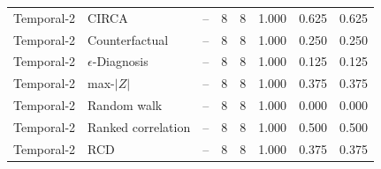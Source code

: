 {\begin{longtable}{llrrrrrr}
Temporal-2 & CIRCA & -- & 8 & 8 & 1.000 & 0.625 & 0.625 \\
Temporal-2 & Counterfactual & -- & 8 & 8 & 1.000 & 0.250 & 0.250 \\
Temporal-2 & $\epsilon$-Diagnosis & -- & 8 & 8 & 1.000 & 0.125 & 0.125 \\
Temporal-2 & max-$|Z|$ & -- & 8 & 8 & 1.000 & 0.375 & 0.375 \\
Temporal-2 & Random walk & -- & 8 & 8 & 1.000 & 0.000 & 0.000 \\
Temporal-2 & Ranked correlation & -- & 8 & 8 & 1.000 & 0.500 & 0.500 \\
Temporal-2 & RCD & -- & 8 & 8 & 1.000 & 0.375 & 0.375 \\
\end{longtable}
}
